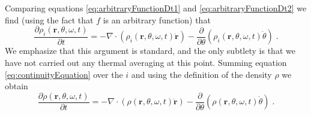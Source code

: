 \documentclass{article}
\begin{document}
Comparing equations \eqref{eq:arbitraryFunctionDt1} and \eqref{eq:arbitraryFunctionDt2} we find (using the fact that $f$ is an arbitrary function) that
\begin{equation}
    \label{eq:continuityEquation}
    \frac{\partial \rho _i\left( \mathbf{r},\theta ,\omega ,t \right)}{\partial t}=-\nabla \cdot \left( \rho _i\left( \mathbf{r},\theta ,\omega ,t \right) \mathbf{\dot{r}} \right) -\frac{\partial}{\partial \theta}\left( \rho _i\left( \mathbf{r},\theta ,\omega ,t \right) \dot{\theta} \right)\;.
\end{equation}
We emphasize that this argument is standard, and the only subtlety is that we have not carried out any thermal averaging at this point. Summing equation \eqref{eq:continuityEquation} over the $i$ and using the definition of the density $\rho$ we obtain
\begin{equation}
    \frac{\partial \rho \left( \mathbf{r},\theta ,\omega ,t \right)}{\partial t}=-\nabla \cdot \left( \rho \left( \mathbf{r},\theta ,\omega ,t \right) \mathbf{\dot{r}} \right) -\frac{\partial}{\partial \theta}\left( \rho \left( \mathbf{r},\theta ,\omega ,t \right) \dot{\theta} \right)\;.
\end{equation}
\end{document}
